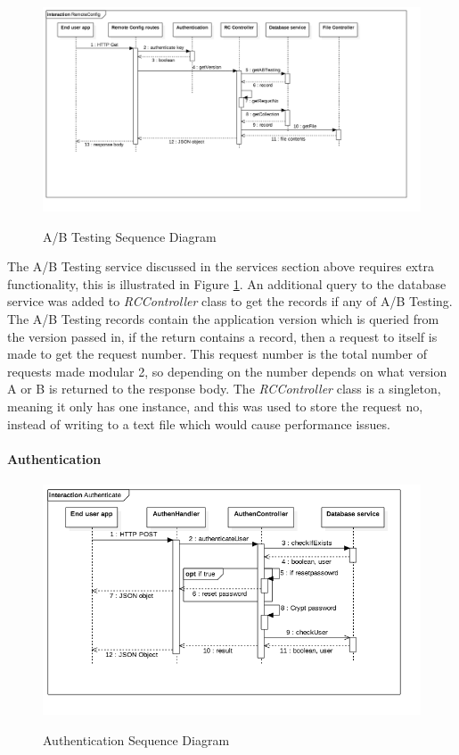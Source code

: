 \begin{figure}[!h]
    \caption{A/B Testing Sequence Diagram}
    \centering
    \includegraphics[width=150mm]{images/sequence/ABTesting}
    \label{fig:ab-seq}
\end{figure} 

The A/B Testing service discussed in the services section above requires extra functionality, this is illustrated in Figure  \ref{fig:ab-seq}. An additional query to the database service was added to \textit{RCController} class to get the records if any of A/B Testing. The A/B Testing records contain the application version which is queried from the version passed in, if the return contains a record, then a request to itself is made to get the request number. This request number is the total number of requests made modular 2, so depending on the number depends on what version A or B is returned to the response body. The \textit{RCController} class is a singleton, meaning it only has one instance, and this was used to store the request no, instead of writing to a text file which would cause performance issues.

\paragraph{Authentication}

\begin{figure}[!h]
    \caption{Authentication Sequence Diagram}
    \centering
    \includegraphics[width=150mm]{images/sequence/Authenticate}
    \label{fig:authenticate-seq}
\end{figure}

